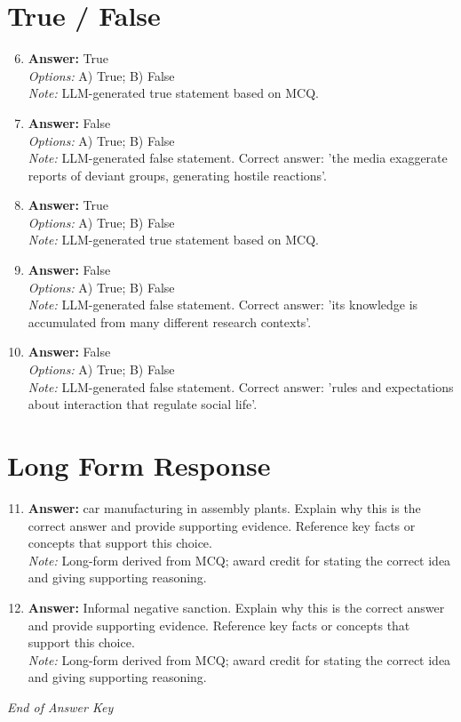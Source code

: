 \documentclass[12pt]{article}
\begin{document}
\section*{True / False}
\begin{enumerate}[label=\arabic*.]
\setcounter{enumi}{5}
\item \textbf{Answer:} True
\\ \textit{Options:} A) True; B) False
\\ \textit{Note:} LLM-generated true statement based on MCQ.
\item \textbf{Answer:} False
\\ \textit{Options:} A) True; B) False
\\ \textit{Note:} LLM-generated false statement. Correct answer: 'the media exaggerate reports of deviant groups, generating hostile reactions'.
\item \textbf{Answer:} True
\\ \textit{Options:} A) True; B) False
\\ \textit{Note:} LLM-generated true statement based on MCQ.
\item \textbf{Answer:} False
\\ \textit{Options:} A) True; B) False
\\ \textit{Note:} LLM-generated false statement. Correct answer: 'its knowledge is accumulated from many different research contexts'.
\item \textbf{Answer:} False
\\ \textit{Options:} A) True; B) False
\\ \textit{Note:} LLM-generated false statement. Correct answer: 'rules and expectations about interaction that regulate social life'.
\end{enumerate}

\section*{Long Form Response}
\begin{enumerate}[label=\arabic*.]
\setcounter{enumi}{10}
\item \textbf{Answer:} car manufacturing in assembly plants. Explain why this is the correct answer and provide supporting evidence. Reference key facts or concepts that support this choice.
\\ \textit{Note:} Long-form derived from MCQ; award credit for stating the correct idea and giving supporting reasoning.
\item \textbf{Answer:} Informal negative sanction. Explain why this is the correct answer and provide supporting evidence. Reference key facts or concepts that support this choice.
\\ \textit{Note:} Long-form derived from MCQ; award credit for stating the correct idea and giving supporting reasoning.
\end{enumerate}

\vfill
\noindent\textit{End of Answer Key}
\end{document}
